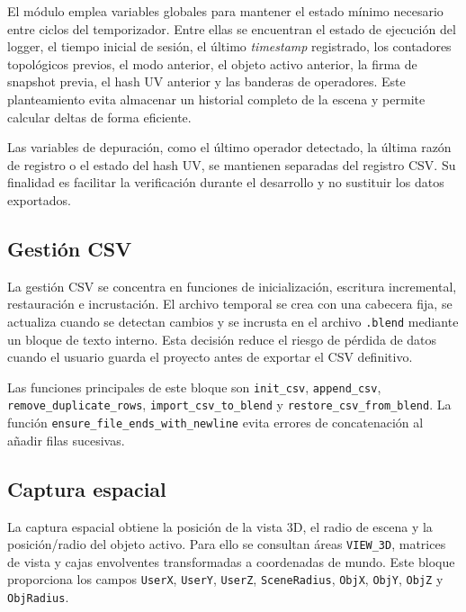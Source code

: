 El módulo emplea variables globales para mantener el estado mínimo necesario entre ciclos del temporizador. Entre ellas se encuentran el estado de ejecución del logger, el tiempo inicial de sesión, el último \textit{timestamp} registrado, los contadores topológicos previos, el modo anterior, el objeto activo anterior, la firma de snapshot previa, el hash UV anterior y las banderas de operadores. Este planteamiento evita almacenar un historial completo de la escena y permite calcular deltas de forma eficiente.

Las variables de depuración, como el último operador detectado, la última razón de registro o el estado del hash UV, se mantienen separadas del registro CSV. Su finalidad es facilitar la verificación durante el desarrollo y no sustituir los datos exportados.

\subsection{Gestión CSV}
\label{subsec:d-logger-csv}

La gestión CSV se concentra en funciones de inicialización, escritura incremental, restauración e incrustación. El archivo temporal se crea con una cabecera fija, se actualiza cuando se detectan cambios y se incrusta en el archivo \texttt{.blend} mediante un bloque de texto interno. Esta decisión reduce el riesgo de pérdida de datos cuando el usuario guarda el proyecto antes de exportar el CSV definitivo.

Las funciones principales de este bloque son \texttt{init\_csv}, \texttt{append\_csv}, \texttt{remove\_duplicate\_rows}, \texttt{import\_csv\_to\_blend} y \texttt{restore\_csv\_from\_blend}. La función \texttt{ensure\_file\_ends\_with\_newline} evita errores de concatenación al añadir filas sucesivas.

\subsection{Captura espacial}
\label{subsec:d-logger-espacial}

La captura espacial obtiene la posición de la vista 3D, el radio de escena y la posición/radio del objeto activo. Para ello se consultan áreas \texttt{VIEW\_3D}, matrices de vista y cajas envolventes transformadas a coordenadas de mundo. Este bloque proporciona los campos \texttt{UserX}, \texttt{UserY}, \texttt{UserZ}, \texttt{SceneRadius}, \texttt{ObjX}, \texttt{ObjY}, \texttt{ObjZ} y \texttt{ObjRadius}.

